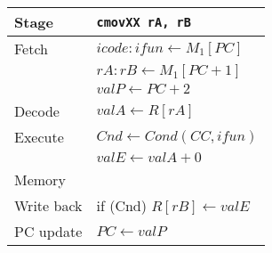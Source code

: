 \documentclass{article}
\begin{document}
\begin{tabular}{l l}
Stage & \texttt{cmovXX rA, rB} \\
\hline
Fetch & $icode: ifun \leftarrow M_1[PC]$ \\
& $rA:rB \leftarrow M_1[PC+1]$ \\
& $valP \leftarrow PC+2$ \\
Decode & $valA \leftarrow R[rA]$ \\
Execute & $Cnd \leftarrow Cond(CC, ifun)$ \\
& $valE \leftarrow valA + 0$ \\
Memory & \\
Write back & if (Cnd) $R[rB] \leftarrow valE$ \\
PC update & $PC \leftarrow valP$ \\
\end{tabular}
\end{document}
